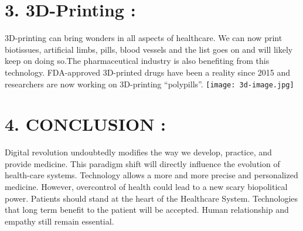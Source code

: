 \documentclass[12pt]{article}
\begin{document}
\section*{3. 3D-Printing :}
3D-printing can bring wonders in all aspects of healthcare. We can now print biotissues, artificial limbs, pills, blood vessels and the list goes on and will likely keep on doing so.The pharmaceutical industry is also benefiting from this technology. FDA-approved 3D-printed drugs have been a reality since 2015 and researchers are now working on 3D-printing “polypills”.
\centering
\texttt{[image: 3d-image.jpg]}

\section*{4.  CONCLUSION :}
Digital revolution undoubtedly modifies the way we develop, practice, and provide medicine. This paradigm shift will directly influence the evolution of health-care systems. Technology allows a more and more precise and personalized medicine. However, overcontrol of health could lead to a new scary biopolitical power. Patients should stand at the heart of the Healthcare System. Technologies that long term benefit to the patient will be accepted. Human relationship and empathy still remain essential.
\end{document}
